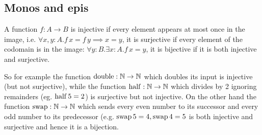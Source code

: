 \subsection{Monos and epis}
\label{sec:monos-epis}

A function $f:A\to B$ is injective if every element appears at most once in the image, i.e. $\forall x,y:A.f\,x = f\,y \implies x = y$, it is surjective if every element of the codomain is in the image: $\forall y:B.\exists x:A.f\,x = y$, it is bijective if it is both injective and surjective. 

So for example the function $\mathrm{double} : \mathbb{N} \to \mathbb{N}$ which doubles its input is injective (but not surjective), while the function $\mathrm{half} : \mathbb{N} \to \mathbb{N}$ which divides by 2 ignoring remainders (eg. $\mathrm{half}\,5 = 2$) is surjective but not injective. On the other hand the function $\mathrm{swap} : \mathbb{N} \to \mathbb{N}$ which sends every even number to its successor and every odd number to its predecessor (e.g. $\mathrm{swap}\,5 = 4, \mathrm{swap}\,4 = 5$ is both injective and surjective and hence it is a bijection.  

